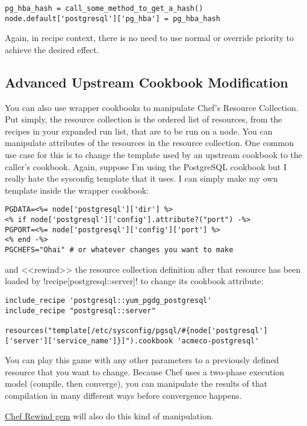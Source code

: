 \begin{lstlisting}[label=lst:wrapper-cookbook5]
pg_hba_hash = call_some_method_to_get_a_hash()
node.default['postgresql']['pg_hba'] = pg_hba_hash
\end{lstlisting}

Again, in recipe context, there is no need to use normal or override priority to achieve the desired effect.


\subsection{Advanced Upstream Cookbook Modification}

You can also use wrapper cookbooks to manipulate Chef's Resource Collection. Put simply, the resource collection is the ordered list of resources, from the recipes in your expanded run list, that are to be run on a node. You can manipulate attributes of the resources in the resource collection. One common use case for this is to change the template used by an upstream cookbook to the caller's cookbook. Again, suppose I'm using the PostgreSQL cookbook but I really hate the sysconfig template that it uses. I can simply make my own template inside the wrapper cookbook:

\begin{lstlisting}[label=lst:wrapper-cookbook6,caption=acmeco-postgresql/templates/pgsql.sysconfig.erb]
PGDATA=<%= node['postgresql']['dir'] %>
<% if node['postgresql']['config'].attribute?("port") -%>
PGPORT=<%= node['postgresql']['config']['port'] %>
<% end -%>
PGCHEFS="Ohai" # or whatever changes you want to make
\end{lstlisting}

and <<rewind>> the resource collection definition after that resource has been loaded by \inline!recipe[postgresql::server]! to change its cookbook attribute:

\begin{lstlisting}[label=lst:wrapper-cookbook7,caption=acmeco-postgresql/recipes/default.rb]
include_recipe 'postgresql::yum_pgdg_postgresql'
include_recipe "postgresql::server"

resources("template[/etc/sysconfig/pgsql/#{node['postgresql']['server']['service_name']}]").cookbook 'acmeco-postgresql'
\end{lstlisting}

You can play this game with any other parameters to a previously defined resource that you want to change. Because Chef uses a two-phase execution model (compile, then converge), you can manipulate the results of that compilation in many different ways before convergence happens.

\href{https://github.com/bryanwb/chef-rewind}{Chef Rewind gem} will also do this kind of manipulation.